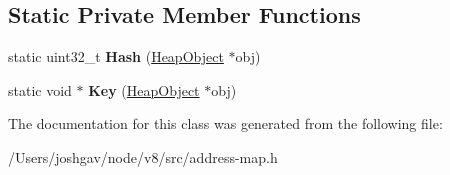 \subsection*{Static Private Member Functions}
\begin{DoxyCompactItemize}
\item 
static uint32\+\_\+t {\bfseries Hash} (\hyperlink{classv8_1_1internal_1_1_heap_object}{Heap\+Object} $\ast$obj)\hypertarget{classv8_1_1internal_1_1_address_map_base_a310a6ae7d8e9d54246c6fd76b8efc304}{}\label{classv8_1_1internal_1_1_address_map_base_a310a6ae7d8e9d54246c6fd76b8efc304}

\item 
static void $\ast$ {\bfseries Key} (\hyperlink{classv8_1_1internal_1_1_heap_object}{Heap\+Object} $\ast$obj)\hypertarget{classv8_1_1internal_1_1_address_map_base_a60eeafde4d0db85e402dfd02b9774816}{}\label{classv8_1_1internal_1_1_address_map_base_a60eeafde4d0db85e402dfd02b9774816}

\end{DoxyCompactItemize}


The documentation for this class was generated from the following file\+:\begin{DoxyCompactItemize}
\item 
/\+Users/joshgav/node/v8/src/address-\/map.\+h\end{DoxyCompactItemize}
